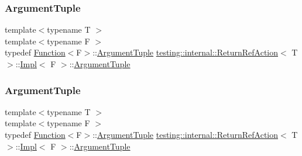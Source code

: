 \subsubsection{\texorpdfstring{ArgumentTuple}{ArgumentTuple}\hspace{0.1cm}{\footnotesize\ttfamily [2/3]}}
{\footnotesize\ttfamily template$<$typename T $>$ \\
template$<$typename F $>$ \\
typedef \mbox{\hyperlink{structtesting_1_1internal_1_1_function}{Function}}$<$F$>$\+::\mbox{\hyperlink{classtesting_1_1_action_interface_af72720d864da4d606629e83edc003511}{Argument\+Tuple}} \mbox{\hyperlink{classtesting_1_1internal_1_1_return_ref_action}{testing\+::internal\+::\+Return\+Ref\+Action}}$<$ T $>$\+::\mbox{\hyperlink{classtesting_1_1internal_1_1_return_ref_action_1_1_impl}{Impl}}$<$ F $>$\+::\mbox{\hyperlink{classtesting_1_1_action_interface_af72720d864da4d606629e83edc003511}{Argument\+Tuple}}}

\mbox{\label{classtesting_1_1internal_1_1_return_ref_action_1_1_impl_a69311fc7b75aba0f2c444d6766c82a4a}} 
\subsubsection{\texorpdfstring{ArgumentTuple}{ArgumentTuple}\hspace{0.1cm}{\footnotesize\ttfamily [3/3]}}
{\footnotesize\ttfamily template$<$typename T $>$ \\
template$<$typename F $>$ \\
typedef \mbox{\hyperlink{structtesting_1_1internal_1_1_function}{Function}}$<$F$>$\+::\mbox{\hyperlink{classtesting_1_1_action_interface_af72720d864da4d606629e83edc003511}{Argument\+Tuple}} \mbox{\hyperlink{classtesting_1_1internal_1_1_return_ref_action}{testing\+::internal\+::\+Return\+Ref\+Action}}$<$ T $>$\+::\mbox{\hyperlink{classtesting_1_1internal_1_1_return_ref_action_1_1_impl}{Impl}}$<$ F $>$\+::\mbox{\hyperlink{classtesting_1_1_action_interface_af72720d864da4d606629e83edc003511}{Argument\+Tuple}}}

\mbox{\label{classtesting_1_1internal_1_1_return_ref_action_1_1_impl_a9d55719e344507c0579150cdf307c8bc}} 
